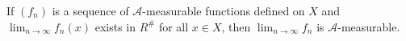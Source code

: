 If $(f_n)$ is a sequence of $\mathcal{A}$-measurable functions defined on $X$ and $\lim_{n \to \infty} f_n(x)$ exists in $R^\#$ for all $x \in X$, then $\lim_{n \to \infty} f_n$ is $\mathcal{A}$-measurable.